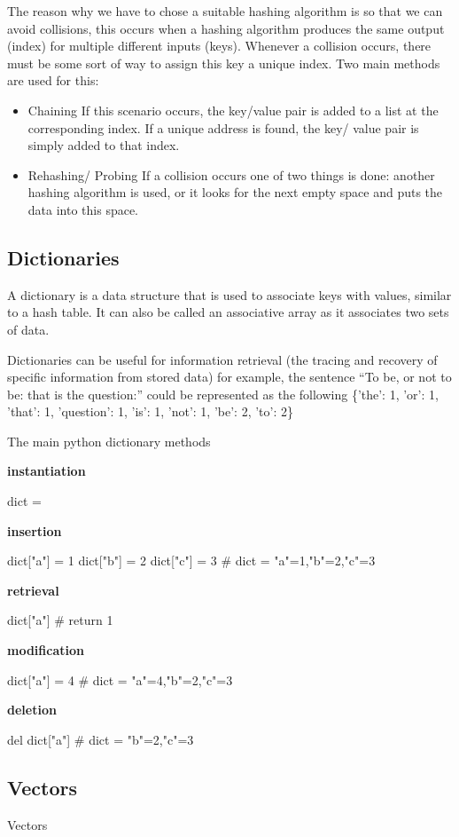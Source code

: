   The reason why we have to chose a suitable hashing algorithm is so that we can avoid collisions, this occurs when a hashing algorithm produces the same output (index) for multiple different inputs (keys). Whenever a collision occurs, there must be some sort of way to assign this key a unique index. Two main methods are used for this:
  \begin{itemize}
  	\item Chaining
	  	\subitem If this scenario occurs, the key/value pair is added to a list at the corresponding index. If a unique address is found, the key/ value pair is simply added to that index.
  	\item Rehashing/ Probing
	  	\subitem If a collision occurs one of two things is done: another hashing algorithm is used, or it looks for the next empty space and puts the data into this space.
  \end{itemize}
\subsection{Dictionaries}
  
  A dictionary is a data structure that is used to associate keys with values, similar to a hash table. It can also be called an associative array as it associates two sets of data.
  
  Dictionaries can be useful for information retrieval (the tracing and recovery of specific information from stored data) for example, the sentence ``To be, or not to be: that is the question:'' could be represented as the following \{'the': 1, 'or': 1, 'that': 1, 'question': 1, 'is': 1, 'not': 1, 'be': 2, 'to': 2\}
  
  The main python dictionary methods
  
  \textbf{instantiation}
  
 \begin{python}
 dict = {}
 \end{python}
  
  \textbf{insertion}

\begin{python}
dict["a"] = 1
dict["b"] = 2
dict["c"] = 3
# dict = {"a"=1,"b"=2,"c"=3}
\end{python}
  
  \textbf{retrieval}

\begin{python}
dict["a"]
# return 1
\end{python}

  \textbf{modification}
  
\begin{python}
dict["a"] = 4
# dict = {"a"=4,"b"=2,"c"=3}
\end{python}

  \textbf{deletion}
  
\begin{python}
del dict["a"]
# dict = {"b"=2,"c"=3}
\end{python}
  
  
\subsection{Vectors}
  
  Vectors